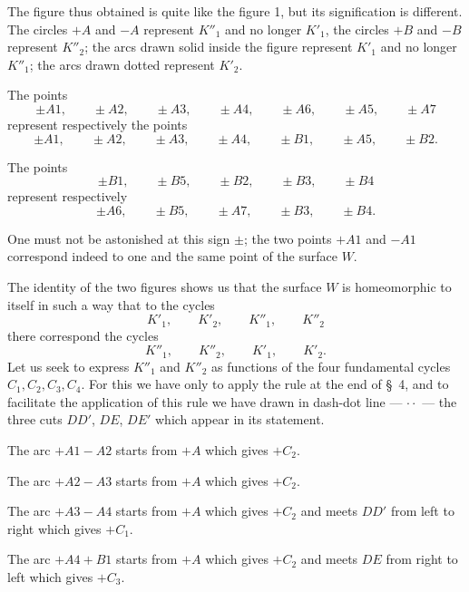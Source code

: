 \documentclass{article}
\begin{document}

The figure thus obtained is quite like the figure 1, but its signification is different. The circles $+A$ and $-A$ represent $K''_{1}$ and no longer $K'_{1}$, the circles $+B$ and $-B$ represent $K''_{2}$; the arcs drawn solid inside the figure represent $K'_{1}$ and no longer $K''_{1}$; the arcs drawn dotted represent $K'_{2}$.

The points
\[ \pm A1, \qquad \pm A2, \qquad \pm A3, \qquad \pm A4, \qquad \pm A6, \qquad \pm A5, \qquad \pm A7 \]
represent respectively the points
\[ \pm A1, \qquad \pm A2, \qquad \pm A3, \qquad \pm A4, \qquad \pm B1, \qquad \pm A5, \qquad \pm B2. \]

The points
\[ \pm B1, \qquad \pm B5, \qquad \pm B2, \qquad \pm B3, \qquad \pm B4 \]
represent respectively
\[ \pm A6, \qquad \pm B5, \qquad \pm A7, \qquad \pm B3, \qquad \pm B4. \]

One must not be astonished at this sign $\pm$; the two points $+A1$ and $-A1$ correspond indeed to one and the same point of the surface $W$.

The identity of the two figures shows us that the surface $W$ is homeomorphic to itself in such a way that to the cycles
\[ K'_{1}, \qquad K'_{2}, \qquad K''_{1}, \qquad K''_{2} \]
there correspond the cycles
\[ K''_{1}, \qquad K''_{2}, \qquad K'_{1}, \qquad K'_{2}. \]
Let us seek to express $K''_{1}$ and $K''_{2}$ as functions of the four fundamental cycles $C_{1}, C_{2}, C_{3}, C_{4}$. For this we have only to apply the rule at the end of \S~4, and to facilitate the application of this rule we have drawn in dash-dot line --- $\cdot\cdot$ --- the three cuts $DD'$, $DE$, $DE'$ which appear in its statement.

The arc $+A1 - A2$ starts from $+A$ which gives $+C_{2}$.

The arc $+A2 - A3$ starts from $+A$ which gives $+C_{2}$.

The arc $+A3 - A4$ starts from $+A$ which gives $+C_{2}$ and meets $DD'$ from left to right which gives $+C_{1}$.

The arc $+A4 + B1$ starts from $+A$ which gives $+C_{2}$ and meets $DE$ from right to left which gives $+C_{3}$.
\end{document}
